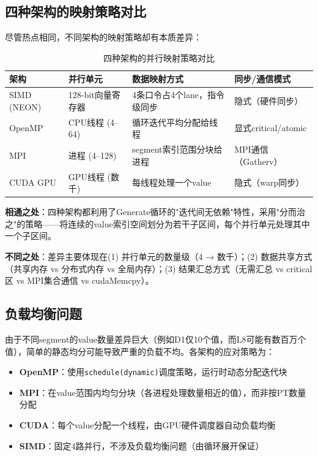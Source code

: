 \documentclass[12pt,a4paper]{ctexart}
\begin{document}
\subsection{四种架构的映射策略对比}

尽管热点相同，不同架构的映射策略却有本质差异：

\begin{table}[ht]
\centering
\caption{四种架构的并行映射策略对比}
\label{tab:mapping}
\begin{tabular}{@{}p{2cm}p{3.5cm}p{3.5cm}p{3.5cm}@{}}
\toprule
\textbf{架构} & \textbf{并行单元} & \textbf{数据映射方式} & \textbf{同步/通信模式} \\
\midrule
SIMD (NEON) & 128-bit向量寄存器 & 4条口令占4个lane，指令级同步 & 隐式（硬件同步）\\
OpenMP      & CPU线程 (4--64)  & 循环迭代平均分配给线程    & 显式critical/atomic \\
MPI         & 进程 (4--128)    & segment索引范围分块给进程  & MPI通信（Gatherv）\\
CUDA GPU    & GPU线程 (数千)   & 每线程处理一个value        & 隐式（warp同步）\\
\bottomrule
\end{tabular}
\end{table}

\textbf{相通之处}：四种架构都利用了Generate循环的"迭代间无依赖"特性，采用"分而治之"的策略——将连续的value索引空间划分为若干子区间，每个并行单元处理其中一个子区间。

\textbf{不同之处}：差异主要体现在(1) 并行单元的数量级（4 → 数千）；(2) 数据共享方式（共享内存 vs 分布式内存 vs 全局内存）；(3) 结果汇总方式（无需汇总 vs critical区 vs MPI集合通信 vs cudaMemcpy）。

\subsection{负载均衡问题}

由于不同segment的value数量差异巨大（例如D1仅10个值，而L8可能有数百万个值），简单的静态均分可能导致严重的负载不均。各架构的应对策略为：

\begin{itemize}[nosep]
    \item \textbf{OpenMP}：使用\texttt{schedule(dynamic)}调度策略，运行时动态分配迭代块
    \item \textbf{MPI}：在value范围内均匀分块（各进程处理数量相近的值），而非按PT数量分配
    \item \textbf{CUDA}：每个value分配一个线程，由GPU硬件调度器自动负载均衡
    \item \textbf{SIMD}：固定4路并行，不涉及负载均衡问题（由循环展开保证）
\end{itemize}
\end{document}
